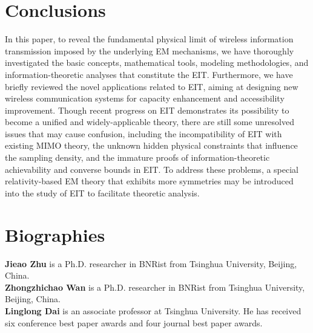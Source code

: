 \documentclass[journal,twocolumn]{IEEEtran}
\begin{document}
\section{Conclusions}
In this paper, to reveal the fundamental physical limit of wireless information transmission imposed by the underlying EM mechanisms, we have thoroughly investigated the basic concepts, mathematical tools, modeling methodologies, and information-theoretic analyses that constitute the EIT. 
Furthermore, we have briefly reviewed the novel applications related to EIT, aiming at designing new wireless communication systems for capacity enhancement and accessibility improvement. Though recent progress on EIT demonstrates its possibility to become a unified and widely-applicable theory, there are still some unresolved issues that may cause confusion, including the incompatibility of EIT with existing MIMO theory, the unknown hidden physical constraints that influence the sampling density, and the immature proofs of information-theoretic achievability and converse bounds in EIT. %
To address these problems, a special relativity-based EM theory that exhibits more symmetries may be introduced into the study of EIT to facilitate theoretic analysis.  


\footnotesize




\normalsize
\section*{Biographies}

{\bf Jieao Zhu} is a Ph.D. researcher in BNRist from Tsinghua University, Beijing, China.
\\

{\bf Zhongzhichao Wan} is a Ph.D. researcher in BNRist from Tsinghua University, Beijing, China.
\\


{\bf Linglong Dai} is an associate professor at Tsinghua University. He has received six conference best paper awards and four journal best paper awards. 
\end{document}
